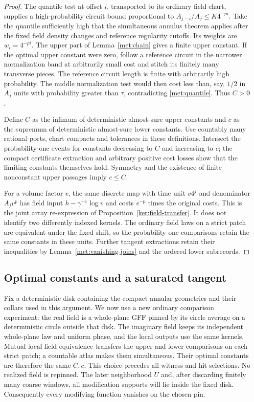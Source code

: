 \documentclass[11pt]{article}
\numberwithin{equation}{section}
\theoremstyle{definition}
\theoremstyle{remark}
\newcommand{\1}{\mathbf 1}
\begin{document}
\begin{proof}
The quantile test at offset $i$, transported to its ordinary field
chart, supplies a high-probability circuit bound proportional to
$A_{j-i}/A_j\leq K4^{-pi}$.  Take the quantile sufficiently high that
the simultaneous annulus theorem applies after the fixed field
density changes and reference regularity cutoffs.  Its weights are
$w_i=4^{-pi}$.  The upper part of Lemma~\ref{met:chain} gives a finite
upper constant.  If the optimal upper constant were zero, follow a
reference circuit in the narrower normalization band at arbitrarily
small cost and stitch its finitely many transverse pieces.  The
reference circuit length is finite with arbitrarily high probability.
The middle normalization test would then cost less than, say, $1/2$
in $A_j$ units with probability greater than $\tau$, contradicting
\eqref{met:quantile}.  Thus $C>0$.

Define $C$ as the infimum of deterministic almost-sure upper constants
and $c$ as the supremum of deterministic almost-sure lower constants.
Use countably many rational ports, chart compacts and tolerances in
these definitions.  Intersect the probability-one events for constants
decreasing to $C$ and increasing to $c$; the compact certificate
extraction and arbitrary positive cost losses show that the limiting
constants themselves hold.  Symmetry and the existence of finite
nonconstant upper passages imply $c\leq C$.

For a volume factor $v$, the same discrete map with time unit $v4^j$
and denominator $A_jv^p$ has field input
$h-\gamma^{-1}\log v$ and costs $v^{-p}$ times the original costs.
This is the joint array re-expression of
Proposition~\ref{ker:field-transfer}.  It does not identify two differently
indexed kernels.  The ordinary field laws on a strict patch are
equivalent under the fixed shift, so the probability-one comparisons
retain the same constants in these units.  Further tangent
extractions retain their inequalities by
Lemma~\ref{met:vanishing-joins} and the ordered lower subrecords.
\end{proof}

\subsection{Optimal constants and a saturated tangent}

Fix a deterministic disk containing the compact annular geometries
and their collars used in this argument.  We now use a new ordinary
comparison experiment: the real field is a whole-plane GFF pinned by
its circle average on a deterministic circle outside that disk.  The
imaginary field keeps its independent whole-plane law and uniform
phase, and the local outputs use the same kernels.  Mutual local
field equivalence transfers the upper and lower comparisons on each
strict patch; a countable atlas makes them simultaneous.  Their
optimal constants are therefore the same $C,c$.  This choice precedes
all witness and hit selections.  No realized field is repinned.
The later neighborhood $U$ and, after discarding finitely many coarse
windows, all modification supports will lie inside the fixed disk.
Consequently every modifying function vanishes on the chosen pin.
\end{document}
